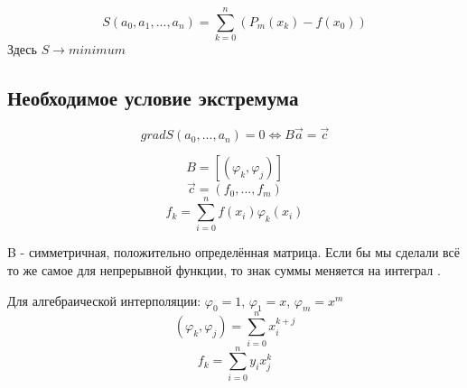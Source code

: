 \documentclass[a4paper,12pt]{article}
\begin{document}
\[S(a_0, a_1, ..., a_n) = \sum_{k=0}^n (P_m(x_k)-f(x_0))\]
Здесь $S \longrightarrow minimum$

\subsection*{Необходимое условие экстремума}
\[grad S(a_0, ..., a_n) = 0 \Leftrightarrow B \overrightarrow{a} = \overrightarrow{c}\]

$$B = [(\varphi_k, \varphi_j)]$$
$$\overrightarrow{c} = (f_0, ..., f_m)$$
\[f_k = \sum_{i=0}^n f(x_i) \varphi_k(x_i)\]

B - симметричная, положительно определённая матрица. Если бы мы сделали всё то же самое для непрерывной функции, то знак суммы меняется на интеграл \int.

Для алгебраической интерполяции:
$\varphi_0 = 1$, $\varphi_1 = x$, $\varphi_m = x ^ m$
\[(\varphi_k, \varphi_j) = \sum_{i = 0}^n x_i^{k+j}\]
\[f_k = \sum_{i=0}^n y_i x_j^k\]
\end{document}

